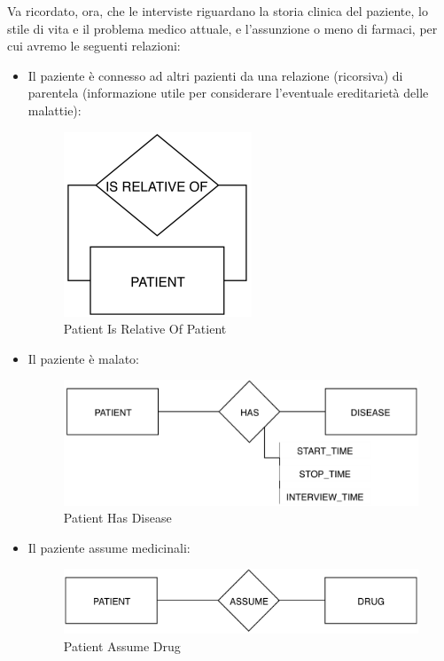 Va ricordato, ora, che le interviste riguardano la storia clinica del paziente, lo stile di vita e il problema medico attuale, e l’assunzione o meno di farmaci, per cui avremo le seguenti relazioni:

\begin{itemize}

\item Il paziente è connesso ad altri pazienti da una relazione (ricorsiva) di parentela (informazione utile per considerare l'eventuale ereditarietà delle malattie): 

\begin{center}
\begin{figure}[H]
\centering
\includegraphics[scale=1]{figures/pirof.png}
\caption{Patient Is Relative Of Patient}
\end{figure}
\end{center}

\item Il paziente è malato:

\begin{center}
\begin{figure}[H]
\centering
\includegraphics[scale=1]{figures/patient_has_disease.png}
\caption{Patient Has Disease}
\end{figure}
\end{center}

\item Il paziente assume medicinali:

\begin{center}
\begin{figure}[H]
\centering
\includegraphics[scale=1]{figures/patient_assume_drug.png}
\caption{Patient Assume Drug}
\end{figure}
\end{center}


\end{itemize}
